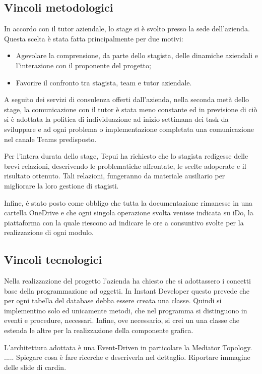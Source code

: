 \subsection{Vincoli metodologici}
In accordo con il tutor aziendale, lo stage si è svolto presso la sede dell'azienda. Questa scelta è stata fatta principalmente per due motivi: 
\begin{itemize}
	\item Agevolare la comprensione, da parte dello stagista, delle dinamiche aziendali e l’interazione con il proponente del progetto; 
	\item Favorire il confronto tra stagista, team e tutor aziendale.
\end{itemize}
A seguito dei servizi di consulenza offerti dall'azienda, nella seconda metà dello stage, la comunicazione con il tutor è stata meno constante ed in previsione di ciò si è adottata la politica di individuazione ad inizio settimana dei task da sviluppare e ad ogni problema o implementazione completata una comunicazione nel canale Teams predisposto.

Per l'intera durata dello stage, Tepui ha richiesto che lo stagista redigesse delle brevi relazioni, descrivendo le problematiche affrontate, le scelte adoperate e il risultato ottenuto. Tali relazioni, fungeranno da materiale ausiliario per migliorare la loro gestione di stagisti.

Infine, é stato posto come obbligo che tutta la documentazione rimanesse in una cartella OneDrive e che ogni singola operazione svolta venisse indicata su iDo, la piattaforma con la quale riescono ad indicare le ore a consuntivo svolte per la realizzazione di ogni modulo.


\subsection{Vincoli tecnologici}
Nella realizzazione del progetto l'azienda ha chiesto che si adottassero i concetti base della programmazione ad oggetti. In Instant Developer questo prevede che per ogni tabella del database debba essere creata una classe. Quindi si implementino solo ed unicamente metodi, che nel programma si distinguono in eventi e procedure, necessari. Infine, ove necessario, si crei un una classe che estenda le altre per la realizzazione della componente grafica.

L'architettura adottata è una Event-Driven in particolare la Mediator Topology. .....
Spiegare cosa è fare ricerche e descriverla nel dettaglio. Riportare immagine delle slide di cardin. \todo


